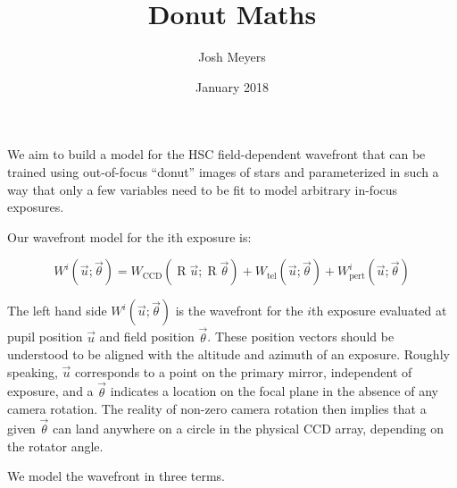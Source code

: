 \documentclass{article}
\title{Donut Maths}
\author{Josh Meyers}
\date{January 2018}
\DeclareMathOperator{\R}{R}
\begin{document}
We aim to build a model for the HSC field-dependent wavefront that can be trained using out-of-focus
``donut'' images of stars and parameterized in such a way that only a few variables need to be fit
to model arbitrary in-focus exposures.

Our wavefront model for the ith exposure is:

\begin{equation}
    W^i\left(\vec{u}; \vec{\theta}\right) = W_\mathrm{CCD}\left(\R \vec{u}; \R \vec{\theta}\right) + W_\mathrm{tel}\left(\vec{u}; \vec{\theta}\right) + W_\mathrm{pert}^i\left(\vec{u}; \vec{\theta}\right)
\end{equation}

The left hand side $W^i\left(\vec{u}; \vec{\theta}\right)$ is the wavefront for the $i$th exposure
evaluated at pupil position $\vec{u}$ and field position $\vec{\theta}$.  These position vectors
should be understood to be aligned with the altitude and azimuth of an exposure.  Roughly speaking,
$\vec{u}$ corresponds to a point on the primary mirror, independent of exposure, and a
$\vec{\theta}$ indicates a location on the focal plane in the absence of any camera rotation.  The
reality of non-zero camera rotation then implies that a given $\vec{\theta}$ can land anywhere on a
circle in the physical CCD array, depending on the rotator angle.

We model the wavefront in three terms.
\end{document}
